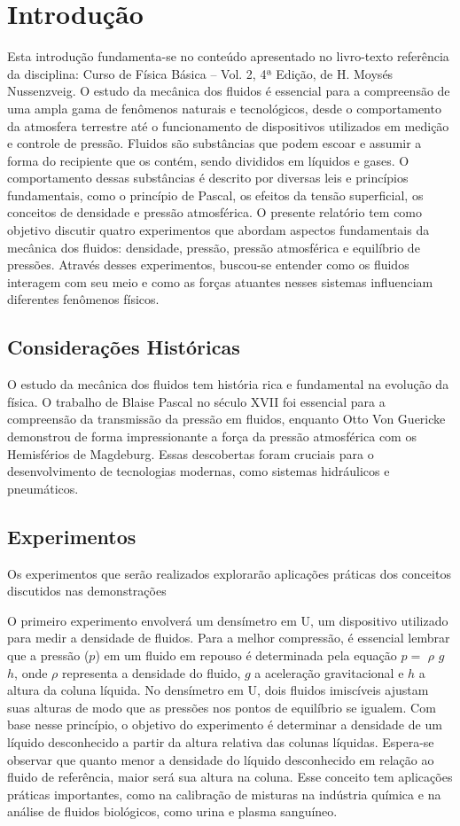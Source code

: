 \section{Introdução}

Esta introdução fundamenta-se no conteúdo apresentado no livro-texto referência da disciplina: Curso de Física Básica – Vol. 2, 4ª Edição, de H. Moysés Nussenzveig.
O estudo da mecânica dos fluidos é essencial para a compreensão de uma ampla gama de fenômenos naturais e tecnológicos, desde o comportamento da atmosfera terrestre até o funcionamento de dispositivos utilizados em medição e controle de pressão. Fluidos são substâncias que podem escoar e assumir a forma do recipiente que os contém, sendo divididos em líquidos e gases. O comportamento dessas substâncias é descrito por diversas leis e princípios fundamentais, como o princípio de Pascal, os efeitos da tensão superficial, os conceitos de densidade e pressão atmosférica.
O presente relatório tem como objetivo discutir quatro experimentos que abordam aspectos fundamentais da mecânica dos fluidos: densidade, pressão, pressão atmosférica e equilíbrio de pressões. Através desses experimentos, buscou-se entender como os fluidos interagem com seu meio e como as forças atuantes nesses sistemas influenciam diferentes fenômenos físicos.
\subsection{Considerações Históricas}
O estudo da mecânica dos fluidos tem história rica e fundamental na evolução da física. O trabalho de Blaise Pascal no século XVII foi essencial para a compreensão da transmissão da pressão em fluidos, enquanto Otto Von Guericke demonstrou de forma impressionante a força da pressão atmosférica com os Hemisférios de Magdeburg. Essas descobertas foram cruciais para o desenvolvimento de tecnologias modernas, como sistemas hidráulicos e pneumáticos.


\subsection{Experimentos}
Os experimentos que serão realizados explorarão aplicações práticas dos conceitos discutidos nas demonstrações


O primeiro experimento envolverá um densímetro em U, um dispositivo utilizado para medir a densidade de fluidos. Para a melhor compressão, é essencial lembrar que a pressão (\(p\)) em um fluido em repouso é determinada pela equação \(p =\) \(\rho\) \(g\) \(h\), onde \(\rho\) representa a densidade do fluido, \(g\) a aceleração gravitacional e \(h\) a altura da coluna líquida. No densímetro em U, dois fluidos imiscíveis ajustam suas alturas de modo que as pressões nos pontos de equilíbrio se igualem. Com base nesse princípio, o objetivo do experimento é determinar a densidade de um líquido desconhecido a partir da altura relativa das colunas líquidas. Espera-se observar que quanto menor a densidade do líquido desconhecido em relação ao fluido de referência, maior será sua altura na coluna. Esse conceito tem aplicações práticas importantes, como na calibração de misturas na indústria química e na análise de fluidos biológicos, como urina e plasma sanguíneo.


